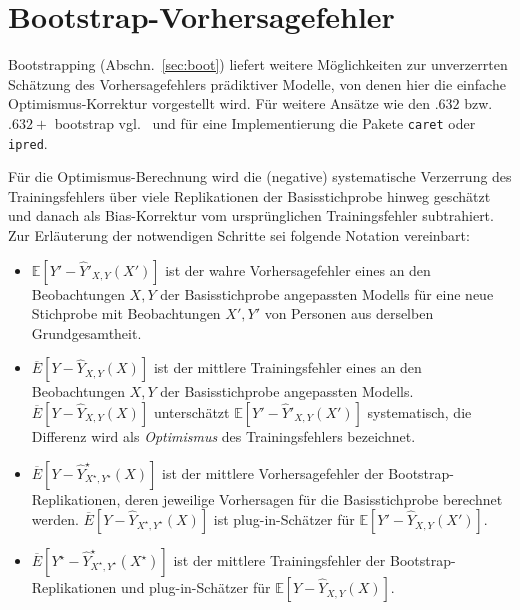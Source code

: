 \section{Bootstrap-Vorhersagefehler}
\label{sec:predBoot}

Bootstrapping (Abschn.\ \ref{sec:boot}) liefert weitere Möglichkeiten zur unverzerrten Schätzung des Vorhersagefehlers prädiktiver Modelle, von denen hier die einfache Optimismus-Korrektur vorgestellt wird. Für weitere Ansätze wie den $.632$ bzw.\ $.632+$ bootstrap vgl.\  und für eine Implementierung die Pakete  \lstinline!caret! oder  \lstinline!ipred!.

Für die Optimismus-Berechnung wird die (negative) systematische Verzerrung des Trainingsfehlers über viele Replikationen der Basisstichprobe hinweg geschätzt und danach als Bias-Korrektur vom ursprünglichen Trainingsfehler subtrahiert. Zur Erläuterung der notwendigen Schritte sei folgende Notation vereinbart:
\begin{itemize}
\item $\mathbb{E}[Y' - \hat{Y}'_{X, Y}(X')]$ ist der wahre Vorhersagefehler eines an den Beobachtungen $X, Y$ der Basisstichprobe angepassten Modells für eine neue Stichprobe mit Beobachtungen $X', Y'$ von Personen aus derselben Grundgesamtheit.

\item $\overline{E}[Y - \hat{Y}_{X, Y}(X)]$ ist der mittlere Trainingsfehler eines an den Beobachtungen $X, Y$ der Basisstichprobe angepassten Modells. $\overline{E}[Y - \hat{Y}_{X, Y}(X)]$ unterschätzt $\mathbb{E}[Y' - \hat{Y}'_{X, Y}(X')]$ systematisch, die Differenz wird als \emph{Optimismus} des Trainingsfehlers bezeichnet.

\item $\overline{E}[Y - \hat{Y}^{\star}_{X^{\star}, Y^{\star}}(X)]$ ist der mittlere Vorhersagefehler der Bootstrap-Replikationen, deren jeweilige Vorhersagen für die Basisstichprobe berechnet werden. $\overline{E}[Y - \hat{Y}_{X^{\star}, Y^{\star}}(X)]$ ist plug-in-Schätzer für $\mathbb{E}[Y' - \hat{Y}_{X, Y}(X'	)]$.
    
\item $\overline{E}[Y^{\star} - \hat{Y}^{\star}_{X^{\star}, Y^{\star}}(X^{\star})]$ ist der mittlere Trainingsfehler der Bootstrap-Replikationen und plug-in-Schätzer für $\mathbb{E}[Y - \hat{Y}_{X, Y}(X)]$.
\end{itemize}

